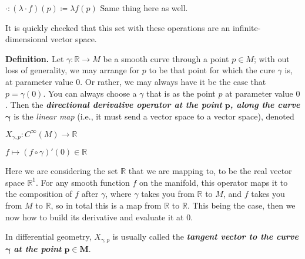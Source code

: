 \documentclass[12pt, a4paper]{article}
\begin{document}
\vspace{4mm}

\hspace{10mm}$\cdot\colon (\lambda\cdot f)(p)\coloneqq \lambda f(p)$ Same thing here as well.

\vspace{4mm}

It is quickly checked that this set with these operations are an infinite-dimensional vector space.\par

\vspace{4mm}

\begin{flushleft}
\textbf{Definition.} Let $\gamma\colon\mathbb{R}\rightarrow M$ be a smooth curve through a point $p\in M$; with out loss of generality, we may arrange for $p$ to be that point for which the cure $\gamma$ is, at parameter value $0$. Or rather, we may always have it be the case that $p=\gamma(0)$. You can always choose a $\gamma$ that is as the point $p$ at parameter value $0$. Then the \textit{\textbf{directional derivative operator at the point}} $\bm{p}$\textit{\textbf{, along the curve}} $\bm{\gamma}$ is the \textit{linear map} (i.e., it must send a vector space to a vector space), denoted\par

\vspace{8mm}

\centerline{$X_{\gamma, p}\colon C^{\infty}(M)\rightarrow\mathbb{R}$}
\vspace{2mm}
\hspace{85mm}$f\mapsto (f\circ\gamma)'(0)\in\mathbb{R}$
\vspace{2mm}
\hspace{45mm}
\vspace{6mm}

Here we are considering the set $\mathbb{R}$ that we are mapping to, to be the real vector space $\mathbb{R}^1$. For any smooth function $f$ on the manifold, this operator maps it to the composition of $f$ after $\gamma$, where $\gamma$ takes you from $\mathbb{R}$ to $M$, and $f$ takes you from $M$ to $\mathbb{R}$, so in total this is a map from $\mathbb{R}$ to $\mathbb{R}$. This being the case, then we now how to build its derivative and evaluate it at $0$.\par

\vspace{4mm}

In differential geometry, $X_{\gamma, p}$ is usually called the \textit{\textbf{tangent vector to the curve}} $\bm{\gamma}$ \textit{\textbf{at the point}} $\bm{p\in M}$.
\end{flushleft}
\end{document}
